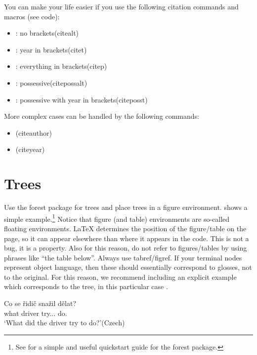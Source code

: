 You can make your life easier if you use the following citation commands and macros (see code):

\begin{itemize}
    \item \citealt{Bailyn2004}: no brackets\hfill (citealt)
    \item \citet{Bailyn2004}: year in brackets\hfill (citet)
    \item \citep{Bailyn2004}: everything in brackets\hfill (citep)
    \item {}: possessive\hfill (citepossalt)
    \item {}: possessive with year in brackets\hfill (citeposst)
\end{itemize}

\noindent More complex cases can be handled by the following commands:

\begin{itemize}
    \item \citeauthor{Bailyn2004}\hfill (citeauthor)
    \item \citeyear{Bailyn2004}\hfill (citeyear)
\end{itemize}

\section{Trees}\label{s:tree}

Use the forest package for trees and place trees in a figure environment.  shows a simple example.\footnote{See \citet{VandenWyngaerd2020} for a simple and useful quickstart guide for the forest package.} Notice that figure (and table) environments are so-called floating environments. {\LaTeX} determines the position of the figure/table on the page, so it can appear elsewhere than where it appears in the code. This is not a bug, it is a property. Also for this reason, do not refer to figures/tables by using phrases like ``the table below''. Always use tabref/figref. If your terminal nodes represent object language, then these should essentially correspond to glosses, not to the original. For this reason, we recommend including an explicit example which corresponds to the tree, in this particular case .

\ea\label{sim:ex:czech-for-tree}\gll Co se řidič snažil dělat?\\
what {\REFL} driver try.{\PTCP.\SG.\MASC} do.{\INF}\\
\glt `What did the driver try to do?'\hfill (Czech)
\z

